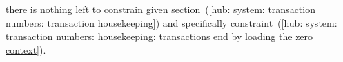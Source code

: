 there is nothing left to constrain given
section~(\ref{hub: system: transaction numbers: transaction housekeeping}) and specifically
constraint~(\ref{hub: system: transaction numbers: housekeeping: transactions end by loading the zero context}).
